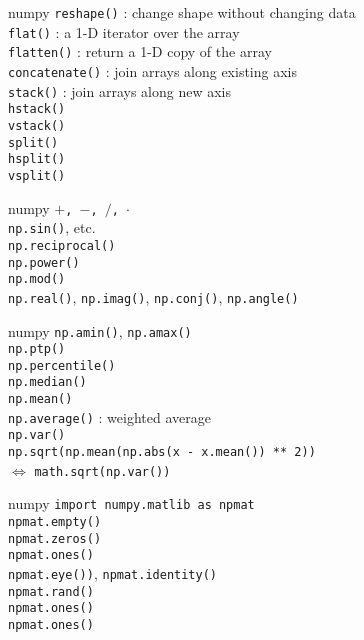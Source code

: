 \begin{frame}{numpy}
  \texttt{reshape()} : change shape without changing data\\
  \texttt{flat()} : a 1-D iterator over the array\\
  \texttt{flatten()} : return a 1-D copy of the array\\[5mm]

  \texttt{concatenate()} : join arrays along existing axis\\
  \texttt{stack()} : join arrays along new axis\\
  \texttt{hstack()}\\
  \texttt{vstack()}\\[5mm]

  \texttt{split()}\\
  \texttt{hsplit()}\\
  \texttt{vsplit()}
\end{frame}

\begin{frame}{numpy}
  \texttt{$+$, $-$, $/$, $\cdot$}\\[2mm]
  \texttt{np.sin()}, etc.\\[2mm]
  \texttt{np.reciprocal()}\\
  \texttt{np.power()}\\
  \texttt{np.mod()}\\[2mm]
  \texttt{np.real()}, \texttt{np.imag()}, \texttt{np.conj()}, \texttt{np.angle()}\\
\end{frame}

\begin{frame}{numpy}
  \texttt{np.amin()}, \texttt{np.amax()}\\
  \texttt{np.ptp()}\\
  \texttt{np.percentile()}\\
  \texttt{np.median()}\\
  \texttt{np.mean()}\\
  \texttt{np.average()} : weighted average\\[2mm]
  \texttt{np.var()}\\[2mm]
  \texttt{np.sqrt(np.mean(np.abs(x - x.mean()) ** 2))} \\
  \hspace{10mm} $\iff$ \texttt{math.sqrt(np.var())}
\end{frame}

\begin{frame}{numpy}
  \texttt{import numpy.matlib as npmat}\\[2mm]
  \texttt{npmat.empty()}\\
  \texttt{npmat.zeros()}\\
  \texttt{npmat.ones()}\\
  \texttt{npmat.eye())}, \texttt{npmat.identity()}\\
  \texttt{npmat.rand()}\\
  \texttt{npmat.ones()}\\
  \texttt{npmat.ones()}\\
\end{frame}

